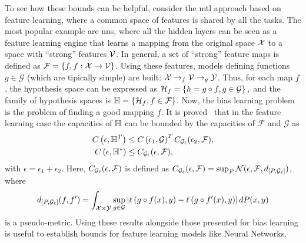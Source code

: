 To see how these bounds can be helpful, consider the \acrshort{mtl} approach based on feature learning, where a common space of features is shared by all the tasks. The most popular example are \acrshort{nns}, where all the hidden layers can be seen as a feature learning engine that learns a mapping from the original space $\mathcal{X}$ to a space with ``strong'' features $\mathcal{V}$.
In general, a set of ``strong'' feature maps is defined as $\mathcal{F} = \left\{f, f: \mathcal{X} \to \mathcal{V}\right\}$. Using these features, models defining functions $g \in \mathcal{G}$ (which are tipically simple) are built:
$\mathcal{X} \to_f \mathcal{V} \to_g \mathcal{Y}$.
Thus, for each map $f$, the hypothesis space can be expressed as 
$\mathcal{H}_f = \left\{h = g \circ f, g \in \mathcal{G}\right\},$ and the family of hypothesis spaces is 
$\mathbb{H} = \left\{\mathcal{H}_f, f \in \mathcal{F}\right\}$.
Now, the bias learning problem is the problem of finding a good mapping $f$.
It is proved~\cite[Theorem~6]{baxter2000model} that in the feature learning case the capacities of $\mathbb{H}$ can be bounded by the capacities of $\mathcal{F}$ and $\mathcal{G}$ as
\begin{align*}
    C\left(\epsilon, \mathbb{H}^{T}\right) &\leq C\left(\epsilon_1, \mathcal{G}\right)^T C_{\mathcal{G}_\ell}(\epsilon_2, \mathcal{F}) , \\
    C\left(\epsilon, \mathbb{H}^{*}\right) &\leq C_{\mathcal{G}_\ell}(\epsilon, \mathcal{F}) ,
\end{align*}
with $\epsilon = \epsilon_1 + \epsilon_2 $. Here, $C_{\mathcal{G}_\ell}(\epsilon, \mathcal{F})$ is defined as 
$C_{\mathcal{G}_\ell}(\epsilon, \mathcal{F}) = \sup_P \mathcal{N}(\epsilon, \mathcal{F}, d_{[P, \mathcal{G}_\ell]})$, where
$$ d_{[P, \mathcal{G}_\ell]}(f, f') = \int_{\mathcal{X} \times \mathcal{Y}} \sup_{g \in \mathcal{G}} \left|\ell\left( g \circ f(x), y\right) - \ell\left( g \circ f'(x), y\right)\right| dP(x, y)$$
is a pseudo-metric. Using these results alongside those presented for bias learning is useful to establish bounds for feature learning models like Neural Networks.

